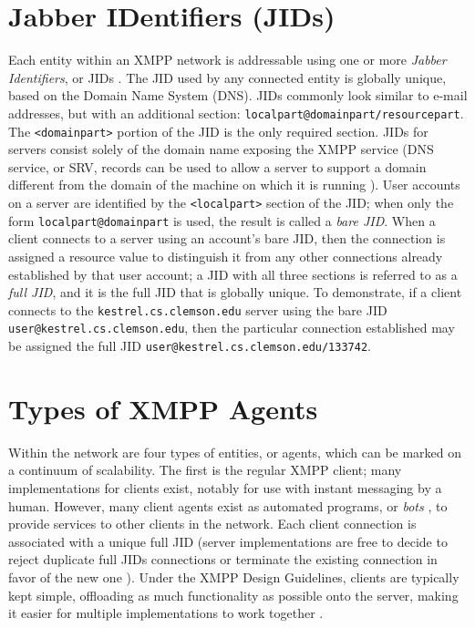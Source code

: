 \section{Jabber IDentifiers (JIDs)}
\label{sec:JIDs}

Each entity within an XMPP network is addressable using one or more
\textit{Jabber Identifiers}, or JIDs \cite{RFC3920}. The JID used by any
connected entity is globally unique, based on the Domain Name System (DNS).
JIDs commonly look similar to e-mail addresses, but with an additional section:
\texttt{localpart@domainpart/resourcepart}. The \texttt{<domainpart>} portion
of the JID is the only required section. JIDs for servers consist solely
of the domain name exposing the XMPP service (DNS service, or SRV, records
can be used to allow a server to support a domain different from the domain
of the machine on which it is running \cite{RFC3920}). User accounts on a
server are identified by the \texttt{<localpart>} section of the JID; when
only the form \texttt{localpart@domainpart} is used, the result is called
a \textit{bare JID}. When a client connects to a server using an account's
bare JID, then the connection is assigned a resource value to distinguish
it from any other connections already established by that user account;
a JID with all three sections is referred to as a \textit{full JID}, and
it is the full JID that is globally unique. To demonstrate, if a client
connects to the \texttt{kestrel.cs.clemson.edu} server using the bare JID
\texttt{user@kestrel.cs.clemson.edu}, then the particular connection established
may be assigned the full JID \texttt{user@kestrel.cs.clemson.edu/133742}.

\section{Types of XMPP Agents}
\label{sec:Types-of-XMPP-Agents}

Within the network are four types of entities, or agents, which can be marked
on a continuum of scalability. The first is the regular XMPP client; many
implementations for clients exist, notably for use with instant messaging by a
human. However, many client agents exist as automated programs, or \textit{bots}
\cite{RFC3921}, to provide services to other clients in the network. Each
client connection is associated with a unique full JID (server implementations
are free to decide to reject duplicate full JIDs connections or terminate the
existing connection in favor of the new one \cite{RFC3920}). Under
the XMPP Design Guidelines, clients are typically kept simple, offloading as
much functionality as possible onto the server, making it easier for multiple
implementations to work together \cite{XEP-0134}.

